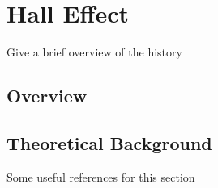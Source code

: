 \section{Hall Effect}\label{sec:hall_effect}
Give a brief overview of the history
\subsection{Overview}\label{subsec:hall_overview}
\subsection{Theoretical Background}\label{subsec:hall_theory}
Some useful references for this section \cite{Hall_AmerJournMath1879,Schroder_Semiconductor2006,Kittel_IntroSolidState2005,Ashcroft_SolidStatePhysics1978,Melissinos_Experiments1966,Baumgartner_HallEffect2006}